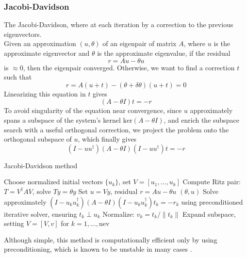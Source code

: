 \subsubsection{Jacobi-Davidson}
The Jacobi-Davidson, where at each iteration by a correction to the previous eigenvectors.
\\Given an approximation $(u, \theta)$ of an eigenpair of matrix $A$, where $u$ is the approximate eigenvector and $\theta$ is the approximate eigenvalue, if the residual
\begin{equation}
    \label{eq:residual}
    r= A u - \theta u
\end{equation}
is $\approx 0$, then the eigenpair converged. Otherwise, we want to find a correction $t$ such that 
\begin{equation}
    \label{eq:jacobi_correction}
    r= A(u+t) - (\theta + \delta \theta) (u+t) = 0 
\end{equation}
Linearizing this equation in $t$ gives
\begin{equation}
   (A - \theta  I ) t = -r 
\end{equation}
To avoid singularity of the equation near convergence, since $u$ approximately spans a subspace of the system's kernel $\text{ker} (A-\theta I)$, and enrich the subspace search with a useful orthogonal correction, we project the problem onto the orthogonal subspace of $u$, which finally gives
\begin{equation}
    \label{eq:jacobi_eq_proj}
    ( I - uu^\dagger) (A - \theta  I )(I - u u^\dagger) t = -r
\end{equation}
\begin{algorithm}[H]
\caption{Jacobi-Davidson method}
\begin{algorithmic}[1]
\STATE Choose normalized initial vectors $\{u_k\}$, set $V = [u_1, \ldots, u_{k}]$
\REPEAT
    \STATE Compute Ritz pair: $T = V^\dagger A V$, solve $T y = \theta y$
    \STATE Set $u = V y$, residual $r = A u - \theta u$
         \RETURN $(\theta, u)$
    \ENDIF
    \STATE Solve approximately $(I - u_k u_k^\dagger)(A - \theta I)(I - u_k u_k^\dagger) t_k = -r_k$
        using preconditioned iterative solver, ensuring $t_k \perp u_k$
    \STATE Normalize: $v_k = t_k / \|t_k\|$
    \STATE Expand subspace, setting $V = [V, v]$
for $k = 1, \dots, \text{nev}$
\end{algorithmic}
\end{algorithm}
Although simple, this method is computationally efficient only by using preconditioning, which is known to be unstable in many cases \cite{Saad1992}.

